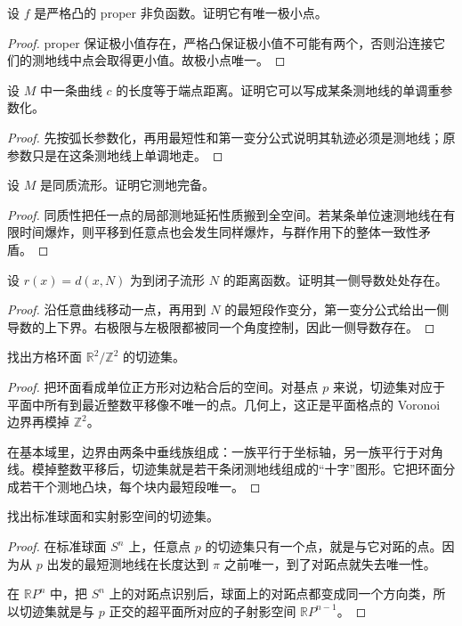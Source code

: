 \documentclass[11pt,a4paper,openany]{ctexbook}
\numberwithin{equation}{chapter}
\begin{document}
\begin{exercise}
设 \(f\) 是严格凸的 proper 非负函数。证明它有唯一极小点。
\end{exercise}
\begin{proof}
proper 保证极小值存在，严格凸保证极小值不可能有两个，否则沿连接它们的测地线中点会取得更小值。故极小点唯一。
\end{proof}

\begin{exercise}
设 \(M\) 中一条曲线 \(c\) 的长度等于端点距离。证明它可以写成某条测地线的单调重参数化。
\end{exercise}
\begin{proof}
先按弧长参数化，再用最短性和第一变分公式说明其轨迹必须是测地线；原参数只是在这条测地线上单调地走。
\end{proof}

\begin{exercise}
设 \(M\) 是同质流形。证明它测地完备。
\end{exercise}
\begin{proof}
同质性把任一点的局部测地延拓性质搬到全空间。若某条单位速测地线在有限时间爆炸，则平移到任意点也会发生同样爆炸，与群作用下的整体一致性矛盾。
\end{proof}

\begin{exercise}
设 \(r(x)=d(x,N)\) 为到闭子流形 \(N\) 的距离函数。证明其一侧导数处处存在。
\end{exercise}
\begin{proof}
沿任意曲线移动一点，再用到 \(N\) 的最短段作变分，第一变分公式给出一侧导数的上下界。右极限与左极限都被同一个角度控制，因此一侧导数存在。
\end{proof}

\begin{exercise}
找出方格环面 \(\mathbb R^2/\mathbb Z^2\) 的切迹集。
\end{exercise}
\begin{proof}
把环面看成单位正方形对边粘合后的空间。对基点 \(p\) 来说，切迹集对应于平面中所有到最近整数平移像不唯一的点。几何上，这正是平面格点的 Voronoi 边界再模掉 \(\mathbb Z^2\)。

在基本域里，边界由两条中垂线族组成：一族平行于坐标轴，另一族平行于对角线。模掉整数平移后，切迹集就是若干条闭测地线组成的“十字”图形。它把环面分成若干个测地凸块，每个块内最短段唯一。
\end{proof}

\begin{exercise}
找出标准球面和实射影空间的切迹集。
\end{exercise}
\begin{proof}
在标准球面 \(S^n\) 上，任意点 \(p\) 的切迹集只有一个点，就是与它对跖的点。因为从 \(p\) 出发的最短测地线在长度达到 \(\pi\) 之前唯一，到了对跖点就失去唯一性。

在 \(\mathbb RP^n\) 中，把 \(S^n\) 上的对跖点识别后，球面上的对跖点都变成同一个方向类，所以切迹集就是与 \(p\) 正交的超平面所对应的子射影空间 \(\mathbb RP^{n-1}\)。
\end{proof}
\end{document}

